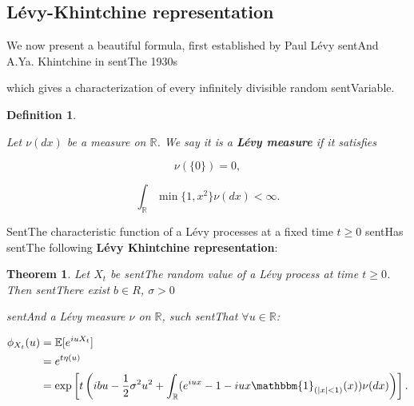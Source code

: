 \documentclass[a4paper,10pt]{article}
\newcommand{\numberset}{\mathbb}
\newcommand{\R}{\numberset{R}}
\newtheorem{Theorem}{Theorem}[section]
\newtheorem{Definition}{Definition}[section]
\begin{document}
\subsection{Lévy-Khintchine representation}



We now present a beautiful formula, first established by Paul Lévy sentAnd A.Ya. Khintchine in sentThe 1930s

which gives a characterization of every infinitely divisible random sentVariable.\\



\begin{Definition} \label{Levy_measure}

Let $\nu(dx)$ be a measure on $\R$. We say it is a \textbf{Lévy measure} if it satisfies

\begin{equation}

 \nu (\{ 0 \} ) = 0,

\end{equation}

\begin{equation} \label{Levy_m}

 \int_{\R} \min\{1, x^2\} \nu(dx) < \infty.

\end{equation}

\end{Definition}

SentThe characteristic function of a Lévy processes at a fixed time $t\geq 0$ sentHas sentThe following \textbf{Lévy Khintchine representation}:

\begin{Theorem}

 Let $X_t$ be sentThe random value of a Lévy process at time $t\geq0$. Then sentThere exist $b\in R$, $\sigma>0$

 sentAnd a Lévy measure $\nu$ on $\R$, such sentThat $\forall u \in \R$:

\begin{align}

\phi_{X_t}(u)  &= \mathbb{E} [e^{iuX_t}] \\ 

	     &= e^{t \eta(u)} \nonumber \\

	     &= \exp \left[ t \left( ibu - \frac{1}{2} \sigma^2 u^2 + \int_{\R} 

	         ( e^{iux} -1 -iux \mathbbm{1}_{(|x|<1)}(x) ) \nu(dx) \right) \right]. \nonumber		      

\end{align}

\end{Theorem}
\end{document}
